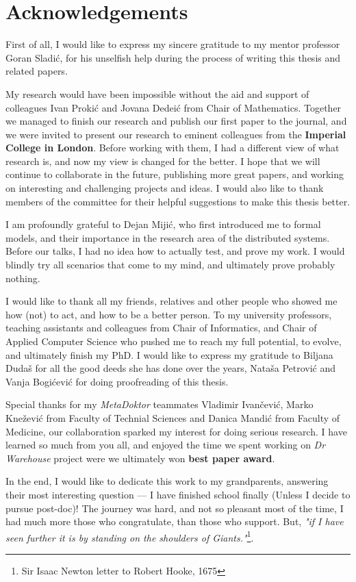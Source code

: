 \chapter*{Acknowledgements}
First of all, I would like to express my sincere gratitude to my mentor professor Goran Sladi\'c, for his unselfish help during the process of writing this thesis and related papers.

My research would have been impossible without the aid and support of colleagues Ivan Proki\'c and Jovana Dedei\'c from Chair of Mathematics. Together we managed to finish our research and publish our first paper to the journal, and we were invited to present our research to eminent colleagues from the \textbf{Imperial College in London}. Before working with them, I had a different view of what research is, and now my view is changed for the better. I hope that we will continue to collaborate in the future, publishing more great papers, and working on interesting and challenging projects and ideas. I would also like to thank members of the committee for their helpful suggestions to make this thesis better.

I am profoundly grateful to Dejan Miji\'c, who first introduced me to formal models, and their importance in the research area of the distributed systems. Before our talks, I had no idea how to actually test, and prove my work. I would blindly try all scenarios that come to my mind, and ultimately prove probably nothing.

I would like to thank all my friends, relatives and other people who showed me how (not) to act, and how to be a better person. To my university professors, teaching assistants and colleagues from Chair of Informatics, and Chair of Applied Computer Science who pushed me to reach my full potential, to evolve, and ultimately finish my PhD. I would like to express my gratitude to Biljana Duda\v s for all the good deeds she has done over the years, Nata\v sa Petrovi\'c and Vanja Bogi\'cevi\'c for doing proofreading of this thesis. 

Special thanks for my \emph{MetaDoktor} teammates Vladimir Ivan\v cevi\'c, Marko Kne\v zevi\'c from Faculty of Technial Sciences and Danica Mandi\'c from Faculty of Medicine, our collaboration sparked my interest for doing serious research. I have learned so much from you all, and enjoyed the time we spent working on \emph{Dr Warehouse} project were we ultimately won \textbf{best paper award}.

In the end, I would like to dedicate this work to my grandparents, answering their most interesting question --- I have finished school finally (Unless I decide to pursue post-doc)! The journey was hard, and not so pleasant most of the time, I had much more those who congratulate, than those who support. But, \emph{"if I have seen further it is by standing on the shoulders of Giants."}\footnote{Sir Isaac Newton letter to Robert Hooke, 1675}.